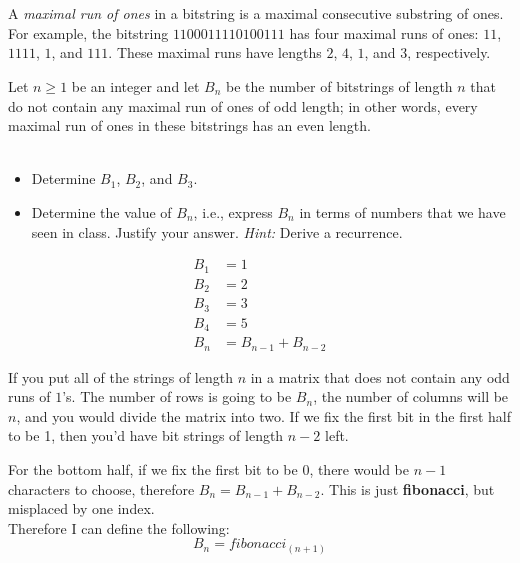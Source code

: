 \documentclass[12pt]{article}
\begin{document}
\begin{question} \\ \\ 
A \emph{maximal run of ones} in a bitstring is a maximal consecutive
substring of ones. For example, the bitstring $1100011110100111$
has four maximal runs of ones: $11$, $1111$, $1$, and $111$. These 
maximal runs have lengths $2$, $4$, $1$, and $3$, respectively. 

Let $n \geq 1$ be an integer and let $B_n$ be the number of bitstrings 
of length $n$ that do not contain any maximal run of ones of odd 
length; in other words, every maximal run of ones in these bitstrings 
has an even length.\\ \\
\parbox{\linewidth}{
\begin{itemize} 
\item Determine $B_1$, $B_2$, and $B_3$. 
\item Determine the value of $B_n$, i.e., express $B_n$ in terms of 
      numbers that we have seen in class. Justify your answer. 
      \emph{Hint:} Derive a recurrence. 
\end{itemize}}
\end{question} 

\begin{answer}
\begin{align*}
B_{1} &= 1 \\
B_{2} &= 2 \\
B_{3} &= 3 \\
B_{4} &= 5 \\
B_{n} &= B_{n-1} + B_{n-2}
\end{align*}

If you put all of the strings of length $n$ in a matrix that does not contain any odd runs of $1$'s. The number of rows is going to be $B_{n}$, the number of columns will be $n$, and you would divide the matrix into two. If we fix the first bit in the first half to be 1, then you'd have bit strings of length $n-2$ left. \newline 

For the bottom half, if we fix the first bit to be $0$, there would be $n-1$ characters to choose, therefore $B_{n} = B_{n-1} + B_{n-2}$. This is just \textbf{fibonacci}, but misplaced by one index. \\

Therefore I can define the following: 
$$B_{n} = fibonacci_{(n+1)}$$
\end{answer}
\end{document}
